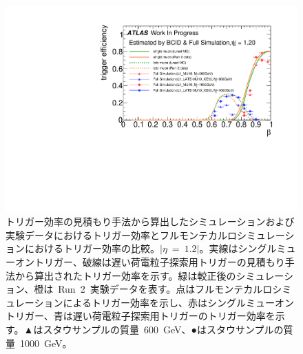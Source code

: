 \begin{figure}[H]
    \centering   
    \includegraphics[width=\textwidth,page=1]{img/rec/tunetune.pdf}
    \caption[トリガー効率の見積もり手法から算出したシミュレーションおよび実験データにおけるトリガー効率とフルモンテカルロシミュレーションにおけるトリガー効率の比較]{トリガー効率の見積もり手法から算出したシミュレーションおよび実験データにおけるトリガー効率とフルモンテカルロシミュレーションにおけるトリガー効率の比較。$|\eta~=~1.2|$。実線はシングルミューオントリガー、破線は遅い荷電粒子探索用トリガーの見積もり手法から算出されたトリガー効率を示す。緑は較正後のシミュレーション、橙は~Run~2~実験データを表す。点はフルモンテカルロシミュレーションによるトリガー効率を示し、赤はシングルミューオントリガー、青は遅い荷電粒子探索用トリガーのトリガー効率を示す。▲はスタウサンプルの質量~600~GeV、●はスタウサンプルの質量~1000~GeV。}\label{fig:rectritune}
\end{figure}
